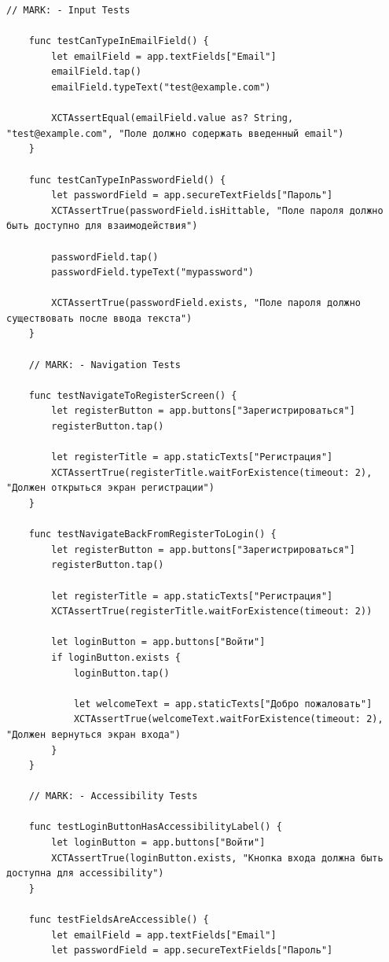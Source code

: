 \begin{lstlisting}[basicstyle=\tiny\ttfamily,breaklines=true]
    // MARK: - Input Tests

    func testCanTypeInEmailField() {
        let emailField = app.textFields["Email"]
        emailField.tap()
        emailField.typeText("test@example.com")

        XCTAssertEqual(emailField.value as? String, "test@example.com", "Поле должно содержать введенный email")
    }

    func testCanTypeInPasswordField() {
        let passwordField = app.secureTextFields["Пароль"]
        XCTAssertTrue(passwordField.isHittable, "Поле пароля должно быть доступно для взаимодействия")

        passwordField.tap()
        passwordField.typeText("mypassword")

        XCTAssertTrue(passwordField.exists, "Поле пароля должно существовать после ввода текста")
    }

    // MARK: - Navigation Tests

    func testNavigateToRegisterScreen() {
        let registerButton = app.buttons["Зарегистрироваться"]
        registerButton.tap()

        let registerTitle = app.staticTexts["Регистрация"]
        XCTAssertTrue(registerTitle.waitForExistence(timeout: 2), "Должен открыться экран регистрации")
    }

    func testNavigateBackFromRegisterToLogin() {
        let registerButton = app.buttons["Зарегистрироваться"]
        registerButton.tap()

        let registerTitle = app.staticTexts["Регистрация"]
        XCTAssertTrue(registerTitle.waitForExistence(timeout: 2))

        let loginButton = app.buttons["Войти"]
        if loginButton.exists {
            loginButton.tap()

            let welcomeText = app.staticTexts["Добро пожаловать"]
            XCTAssertTrue(welcomeText.waitForExistence(timeout: 2), "Должен вернуться экран входа")
        }
    }

    // MARK: - Accessibility Tests

    func testLoginButtonHasAccessibilityLabel() {
        let loginButton = app.buttons["Войти"]
        XCTAssertTrue(loginButton.exists, "Кнопка входа должна быть доступна для accessibility")
    }

    func testFieldsAreAccessible() {
        let emailField = app.textFields["Email"]
        let passwordField = app.secureTextFields["Пароль"]


\end{lstlisting}
